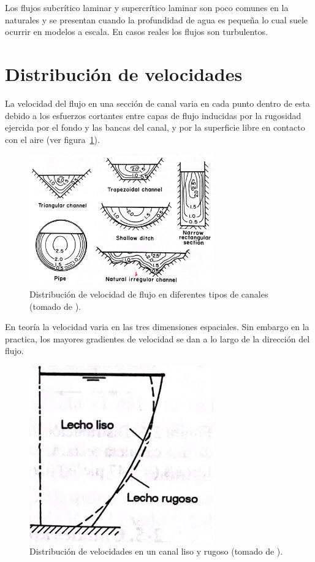\documentclass[11pt, oneside]{article}
\begin{document}
Los flujos subcr\'itico laminar y supercr\'itico laminar son poco comunes en la naturales y se presentan cuando la profundidad de agua es pequeña lo cual suele ocurrir en modelos a escala. En casos reales los flujos son turbulentos.

\section{Distribuci\'on de velocidades}%
La velocidad del flujo en una secci\'on de canal varia en cada punto dentro de esta debido a los esfuerzos cortantes entre capas de flujo inducidas por la rugosidad ejercida por el fondo y las bancas del canal, y por la superficie libre en contacto con el aire (ver figura~\ref{fig5}).

\begin{figure}[h]
\centering
\includegraphics[width=8cm]{fig5.jpeg}
\caption{Distribuci\'on de velocidad de flujo en diferentes tipos de canales (tomado de \cite{Chau}).}
\label{fig5}
\end{figure}


En teor\'ia la velocidad varia en las tres dimensiones espaciales. Sin embargo en la practica, los mayores gradientes de velocidad se dan a lo largo de la direcci\'on del flujo. 
\begin{figure}[h]
\centering
\includegraphics[width=8cm]{fig6.jpeg}
\caption{Distribuci\'on de velocidades en un canal liso y rugoso (tomado de \cite{VChow}).}
\label{fig6}
\end{figure}
\end{document}
